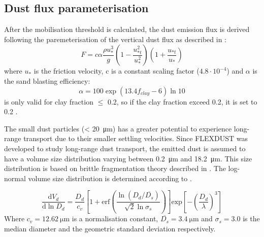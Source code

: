 \subsection{Dust flux parameterisation}

After the mobilisation threshold is calculated,  the dust emission flux is derived following the paremeterisation of the vertical dust flux as described in \textcite{MB95_dust_emission}: 
\begin{equation}
    F=c\alpha \frac{\rho u_{*}^3}{g}\left(1-\frac{u^2_{*t}}{u^2_*}\right)\left(1+ \frac{u_{*t}}{u_*}\right)
\end{equation}
where $u_*$ is the friction velocity, c is a constant scaling factor ($4.8\cdot 10^{-4}$) and $\alpha$ is the sand blasting efficiency:
\begin{equation}\label{eq:sand_blasing_eff}
    \alpha = 100\exp{(13.4f_{clay}-6)\ln 10}
\end{equation}
 is only valid for clay fraction $\leq$ 0.2, so if the clay fraction exceed 0.2, it is set to 0.2 \parencite{zender2003mineral}. 


The small dust particles (< \SI{20}{\micro\metre}) has a greater potential to experience long-range transport due to their smaller settling velocities. Since FLEXDUST was developed to study long-range dust transport, the emitted dust is assumed to have a volume size distribution varying between \SI{0.2}{\micro\metre} and \SI{18.2}{\micro\metre}. This size distribution is based on brittle fragmentation theory described in \textcite{kok_scaling_2011}. The log-normal volume size distribution is determined according to . 

\begin{equation}\label{eq:size_dist}
    \frac{\text{d} V_d}{\text{d} \ln D_d} = \frac{D_d}{c_v}\left[1 + \text{erf}\left(\frac{\ln(D_d/\overline{D_s})}{\sqrt{2}\ln \sigma_s}\right)\right]\text{exp}\left[-\left(\frac{D_d}{\lambda}\right)^3\right]
\end{equation}
Where $c_v = \SI{12.62}{\micro\metre}$ is a normalisation constant, $\overline{D_s}=\SI{3.4}{\micro\metre}$ and $\sigma_s = 3.0$ is the median diameter and the geometric standard deviation respectively.  


